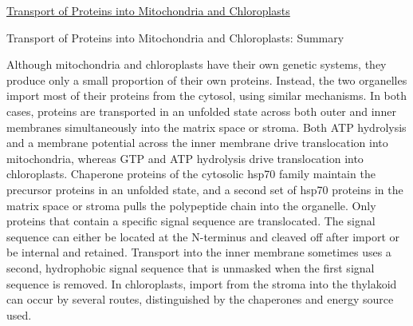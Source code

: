\documentclass[12pt,letterpaper]{article}
\begin{document}
\begin{secbox}{\hyperlink{12}{Transport of Proteins into Mitochondria and Chloroplasts}}
{    \hypertarget{12.3.r}{}
    \begin{probbox}{Transport of Proteins into Mitochondria and Chloroplasts: Summary}\end{probbox}
    Although mitochondria and chloroplasts have their own genetic systems, they produce only a small proportion of their own proteins. Instead, the two organelles import most of their proteins from the cytosol, using similar mechanisms. In both cases, proteins are transported in an unfolded state across both outer and inner membranes simultaneously into the matrix space or stroma. Both ATP hydrolysis and a membrane potential across the inner membrane drive translocation into mitochondria, whereas GTP and ATP hydrolysis drive translocation into chloroplasts. Chaperone proteins of the cytosolic hsp70 family maintain the precursor proteins in an unfolded state, and a second set of hsp70 proteins in the matrix space or stroma pulls the polypeptide chain into the organelle. Only proteins that contain a specific signal sequence are translocated. The signal sequence can either be located at the N-terminus and cleaved off after import or be internal and retained. Transport into the inner membrane sometimes uses a second, hydrophobic signal sequence that is unmasked when the first signal sequence is removed. In chloroplasts, import from the stroma into the thylakoid can occur by several routes, distinguished by the chaperones and energy source used.
}\end{secbox}
\end{document}
